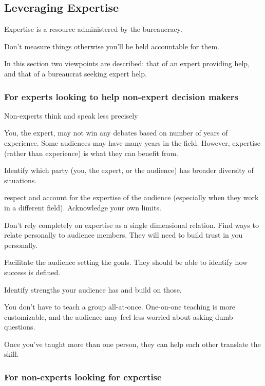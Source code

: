 \subsection{Leveraging Expertise\label{sec:expertise}}

Expertise is a resource administered by the bureaucracy.

Don't measure things otherwise you'll be held accountable for them.

In this section two viewpoints are described: that of an expert providing help, and that of a bureaucrat seeking expert help. 


\subsubsection{For experts looking to help non-expert decision makers}


Non-experts think and speak less precisely

You, the expert, may not win any debates based on number of years of experience. Some audiences may have many years in the field. However, expertise (rather than experience) is what they can benefit from. 

Identify which party (you, the expert, or the audience) has broader diversity of situations.

respect and account for the expertise of the audience (especially when they work in a different field). Acknowledge your own limits.

Don't rely completely on expertise as a single dimensional relation. Find ways to relate personally to audience members. They will need to build trust in you personally.

Facilitate the audience setting the goals. They should be able to identify how success is defined.

Identify strengths your audience has and build on those.

You don't have to teach a group all-at-once. One-on-one teaching is more customizable, and the audience may feel less worried about asking dumb questions.

Once you've taught more than one person, they can help each other translate the skill. 

\subsubsection{For non-experts looking for expertise}

